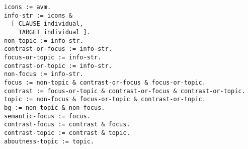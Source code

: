 \documentclass[a4paper]{article}
\begin{document}
{\small\begin{verbatim}
icons := avm.
info-str := icons &
  [ CLAUSE individual,
    TARGET individual ].
non-topic := info-str. 
contrast-or-focus := info-str. 
focus-or-topic := info-str. 
contrast-or-topic := info-str. 
non-focus := info-str.
focus := non-topic & contrast-or-focus & focus-or-topic.
contrast := focus-or-topic & contrast-or-focus & contrast-or-topic.
topic := non-focus & focus-or-topic & contrast-or-topic.
bg := non-topic & non-focus.
semantic-focus := focus.
contrast-focus := contrast & focus. 
contrast-topic := contrast & topic. 
aboutness-topic := topic. 
\end{verbatim}}
\end{document}
